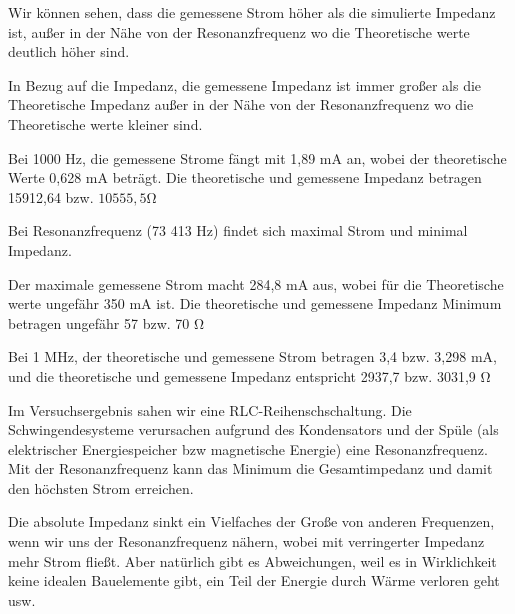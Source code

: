 %
%
Wir können sehen, dass die gemessene Strom höher als die simulierte Impedanz ist, außer in der Nähe von der Resonanzfrequenz wo die Theoretische werte deutlich höher sind.

In Bezug auf die Impedanz, die gemessene Impedanz ist immer großer als die Theoretische Impedanz außer in der Nähe von der Resonanzfrequenz wo die Theoretische werte kleiner sind.

Bei 1000 Hz, die gemessene Strome fängt mit 1,89 $\si{\milli\ampere}$ an, wobei der theoretische Werte 0,628 $\si{\milli\ampere}$ beträgt. Die theoretische und gemessene Impedanz betragen 15912,64 bzw. $10555,5 \si{\ohm}$

Bei Resonanzfrequenz (73 413 Hz) findet sich maximal Strom und minimal Impedanz.

Der maximale gemessene Strom macht 284,8 $\si{\milli\ampere}$ aus, wobei für die Theoretische werte ungefähr 350 $\si{\milli\ampere}$ ist. Die theoretische und gemessene Impedanz Minimum betragen ungefähr 57 bzw.  70 $\si{\ohm}$

Bei 1 MHz, der theoretische und gemessene Strom betragen 3,4 bzw. 3,298 $\si{\milli\ampere}$, und die theoretische und gemessene Impedanz entspricht 2937,7 bzw. 3031,9 $\si{\ohm}$

Im Versuchsergebnis sahen wir eine RLC-Reihenschschaltung. Die Schwingendesysteme verursachen aufgrund des Kondensators und der Spüle (als elektrischer Energiespeicher bzw magnetische Energie) eine Resonanzfrequenz. Mit der Resonanzfrequenz kann das Minimum die Gesamtimpedanz und damit den höchsten Strom erreichen.

Die absolute Impedanz sinkt ein Vielfaches der Große von anderen Frequenzen, wenn wir uns der Resonanzfrequenz nähern, wobei mit verringerter Impedanz mehr Strom fließt. Aber natürlich gibt es Abweichungen, weil es in Wirklichkeit keine idealen Bauelemente gibt, ein Teil der Energie durch Wärme verloren geht usw.
%
%
%
%
%
%
%